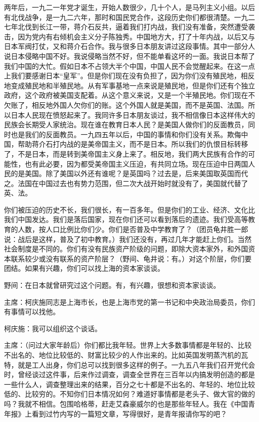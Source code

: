 两年后，一九二一年党才诞生，开始人数很少，几十个人，是马列主义小组。以后有北伐战争，是一九二六年，那时和国民党合作，这段历史你们都很清楚。一九二七年北伐到长江一带，蒋介石反共，逼着我们打内战，我们没有准备，突然遭受袭击，因为党内有右倾机会主义分子陈独秀。中国地方大，打了十年内战，以后又与日本军阀打仗，又和蒋介石合作。我与很多日本朋友讲过这段事情。其中一部分人说日本侵略中国不好。我说侵略当然不好，但不能单看这坏的一面。我说日本帮了我们中国的大忙。假如日本不占领大半个中国，中国人民不会觉醒起来。在这一点上我们要感谢日本“皇军”。但是你们现在没有负担了，因为你们没有殖民地，相反地变成殖民地和半殖民地。从有军事基地一点来说是殖民地，但是你们还有个独立政府，这个政府被美国支配着。从这个意义来说，又是一个半殖民地。你们现在不欠账了，相反地外国人欠你们的账。这个外国人就是美国，而不是英国、法国。所以日本人民现在愤怒起来了。我同许多日本朋友谈过，我不相信像日本这样伟大的民族会长期受人家统治。现在谁在教育日本人民？是美国人做你们的反面教员，同时也是我们的反面教员。一九四五年以后，中国的事情和你们没有关系。欺侮中国，帮助蒋介石打内战的是美帝国主义，而不是日本。所以我们的仇恨目标转移了，不是日本，而是转到美帝国主义身上来了。相反地，我们两大民族有合作的可能性，也有此必要，因为都受美帝国主义压迫，有共同立场。现在压迫中日两国人民的是美国。除了美国以外还有谁呢？是英国吗？过去是，后来美国取英国而代之。法国在中国过去也有势力范围，但二次大战开始时就没有了，美国就代替了英、法。

你们被压迫的历史不长，我们很长，有一百多年。但是你们的工业、经济、文化比我们中国发达。我们是落后国家，现在你们还可以看到落后的遗迹。我们受高等教育的人数，按人口比例比你们少。你们是否普及中学教育了？（团员龟井胜一郎说：战后是这样，普及了初中教育。）我们还没有，再过几年才能赶上你们。当然社会制度是不同的。你们有没有民族资产阶级的问题，即除大资本家外，和外国资本联系较少或没有联系的资产阶层？（野间、龟井说：有。）对这个阶层，你们要团结。如果有兴趣，你们可以找上海的资本家谈谈。

野间：在日本就曾研究过这个问题。有，有兴趣，很想和资本家谈谈。

主席：柯庆施同志是上海市长，也是上海市党的第一书记和中央政治局委员，你们有事情可以找他。

柯庆施：我可以组织这个谈话。

主席：（问过大家年龄后）你们都比我年轻。世界上大多数事情都是年轻的、比较不出名的、地位比较低的、财富比较少的人作出来的。比如英国发明蒸汽机的瓦特，就是工人出身，你们总可以找到很多这样的例子。一九五八年我们召开党代会时，曾经谈过这件事，后来作过调查，调查全世界在三百年以内搞发明创造的都是一些什么人，调查整理出来的结果，百分之七十都是不出名的、年轻的、地位比较低的、比较穷的。不知你们日本情况如何？难道好事情都是老头子、做大官的做的吗？我就不相信。包围哈格蒂，赶走艾森豪威尔的也是那些年轻人。我在《中国青年报》上看到过竹内写的一篇短文章，写得很好，是青年报请你写的吧？

